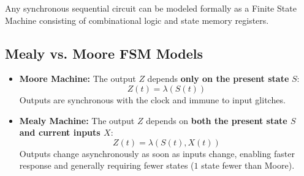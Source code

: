 \documentclass[12pt,a4paper]{article}
\begin{document}
Any synchronous sequential circuit can be modeled formally as a Finite State Machine consisting of combinational logic and state memory registers.

\subsection{Mealy vs. Moore FSM Models}
\begin{tcolorbox}[defbox, title={\textbf{Architectural Definitions of Mealy and Moore Machines}}]
\begin{itemize}[leftmargin=*, itemsep=3pt]
  \item \textbf{Moore Machine:} The output $Z$ depends \textbf{only on the present state} $S$:
  \begin{equation}
    Z(t) = \lambda(S(t))
  \end{equation}
  Outputs are synchronous with the clock and immune to input glitches.
  \item \textbf{Mealy Machine:} The output $Z$ depends on \textbf{both the present state $S$ and current inputs $X$}:
  \begin{equation}
    Z(t) = \lambda(S(t), X(t))
  \end{equation}
  Outputs change asynchronously as soon as inputs change, enabling faster response and generally requiring fewer states ($1$ state fewer than Moore).
\end{itemize}
\end{tcolorbox}
\end{document}
